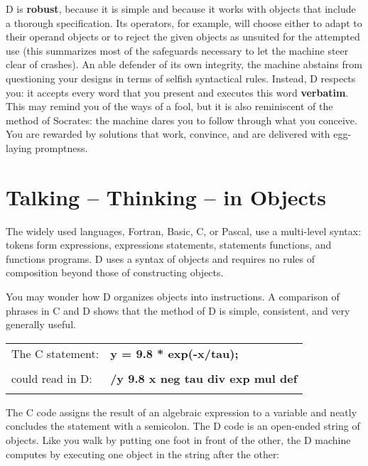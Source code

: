 D is \textbf{robust}, because it is simple and because it works with objects that include a thorough specification.  Its operators,  for example,  will  choose either  to  adapt to their operand objects or to reject the given objects  as unsuited  for  the  attempted  use  (this  summarizes  most  of   the safeguards necessary to let the machine steer clear of crashes). An  able defender of its own integrity, the machine abstains from questioning your designs in terms of selfish syntactical rules. Instead, D respects you:  it  accepts  every  word that you present and  executes  this  word \textbf{verbatim}.  This  may  remind you of the ways of a fool,  but it  is  also reminiscent  of the method of Socrates:  the machine dares you to  follow through  what  you conceive.  You are rewarded by  solutions  that  work, convince, and are delivered with egg-laying promptness.

\section{Talking -- Thinking -- in Objects}

The widely used languages,  Fortran,  Basic,  C, or Pascal, use a multi-level syntax: tokens form expressions, expressions statements, statements functions,  and  functions  programs.  D  uses a syntax  of  objects  and requires no rules of composition beyond those of constructing objects.

You may wonder how D organizes objects into instructions.  A comparison of phrases  in  C and D shows that the  method  of  D  is  simple, consistent, and very generally useful.\\

\begin{tabular}{>{\normalfont}l>{\sffamily\bfseries}l}
The C statement:  & y = 9.8 * exp(-x/tau);\\\\
could read in D:  & /y 9.8 x neg tau div exp mul def\\\\
\end{tabular}

The  C code assigns the result of an algebraic expression to a variable and neatly concludes the statement with a semicolon.  The D code is an open-ended  string of objects.  Like you walk by putting one foot in front of the other,  the D machine computes by executing one object in the  string after the other:

